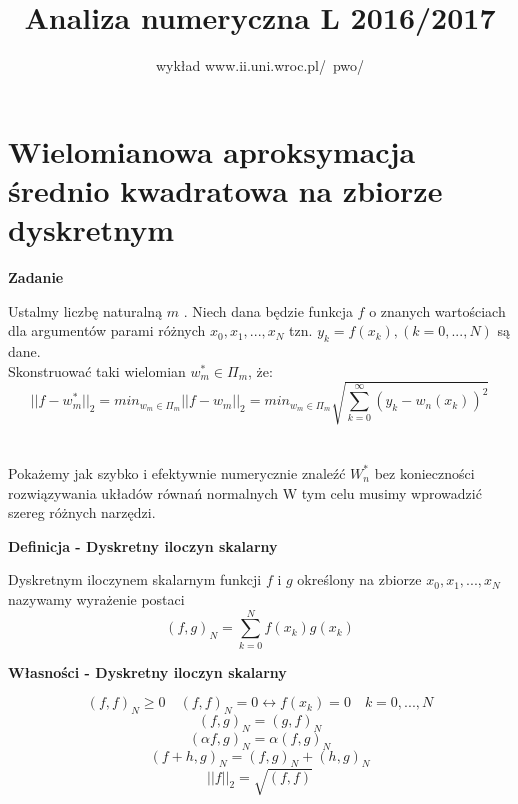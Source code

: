 \documentclass[polish]{kbk}
\begin{document}
\author{wykład www.ii.uni.wroc.pl/~pwo/}
\title{Analiza numeryczna L 2016/2017}



\maketitle

\section{Wielomianowa aproksymacja średnio kwadratowa na zbiorze dyskretnym}

\begin{center}
\textbf{Zadanie}
\end{center}
Ustalmy liczbę naturalną  \(m\) . Niech dana będzie funkcja \(f\) o znanych wartościach dla argumentów parami różnych \(x_0, x_1, ... , x_N\) tzn. 
 \(y_k = f(x_k), (k =0,...,N) \) są dane.\\
Skonstruować taki wielomian \(   w^{*}_m \in \Pi_{m}  \), że:
$$ || f -  w^{*}_m ||_2 = min_{ w_m \in \Pi_m } || f - w_m||_2 = min_{ w_m \in \Pi_m } \sqrt{  \sum_{k=0}^{\infty} (y_k - w_n (x_k))^2 }$$
\\
\\
Pokażemy jak szybko i efektywnie numerycznie znaleźć \(W^{*}_n \) bez konieczności rozwiązywania układów równań normalnych
W tym celu musimy wprowadzić szereg różnych narzędzi.
\\
\begin{center}
\textbf{Definicja - Dyskretny iloczyn skalarny}
\end{center}

Dyskretnym iloczynem skalarnym funkcji \(f\) i \(g\) określony na zbiorze  \(x_0, x_1, ... , x_N\) nazywamy wyrażenie postaci
$$ (f,g)_N =  \sum_{k=0}^{N} f(x_k)  g(x_k) $$


\begin{center}
\textbf{Własności - Dyskretny iloczyn skalarny}
\end{center}
$$ (f,f)_N \geq 0 \quad (f,f)_N = 0  \leftrightarrow  f(x_k) = 0  \quad k = 0,...,N$$
$$ (f,g)_N = (g,f)_N $$
$$ (\alpha f,g)_N = \alpha (f,g)_N $$
$$ (f+h, g)_N = (f,g)_N + (h,g)_N $$
$$ ||f||_2 = \sqrt { (f,f) } $$ 
\end{document}
